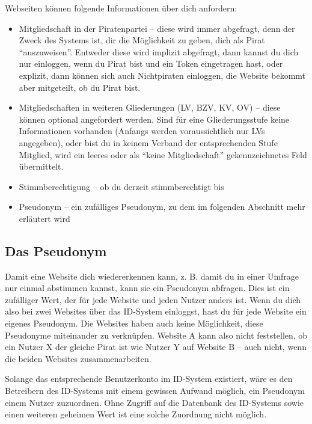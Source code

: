 Webseiten können folgende Informationen über dich anfordern:
\begin{itemize}
	\item Mitgliedschaft in der Piratenpartei -- diese wird immer abgefragt, denn der Zweck des Systems ist, dir die Möglichkeit zu geben, dich als Pirat "`auszuweisen"'.
		Entweder diese wird implizit abgefragt, dann kannst du dich nur einloggen, wenn du Pirat bist und ein Token eingetragen hast,
		oder explizit, dann können sich auch Nichtpiraten einloggen, die Website bekommt aber mitgeteilt, ob du Pirat bist.
	
	\item Mitgliedschaften in weiteren Gliederungen (LV, BZV, KV, OV) -- diese können optional angefordert werden.
		Sind für eine Gliederungsstufe keine Informationen vorhanden (Anfangs werden voraussichtlich nur LVs angegeben),
		oder bist du in keinem Verband der entsprechenden Stufe Mitglied,
		wird ein leeres oder als "`keine Mitgliedschaft"' gekennzeichnetes Feld übermittelt.
		
	\item Stimmberechtigung -- ob du derzeit stimmberechtigt bis
	
	\item Pseudonym -- ein zufälliges Pseudonym, zu dem im folgenden Abschnitt mehr erläutert wird
\end{itemize}

\subsection{Das Pseudonym}
Damit eine Website dich wiedererkennen kann, z. B. damit du in einer Umfrage nur einmal abstimmen kannst, kann sie ein Pseudonym abfragen.
Dies ist ein zufälliger Wert, der für jede Website und jeden Nutzer anders ist.
Wenn du dich also bei zwei Websites über das ID-System einloggst, hast du für jede Website ein eigenes Pseudonym.
Die Websites haben auch keine Möglichkeit, diese Pseudonyme miteinander zu verknüpfen.
Website A kann also nicht feststellen, ob ein Nutzer X der gleiche Pirat ist wie Nutzer Y auf Website B -- auch nicht, wenn die beiden Websites zusammenarbeiten.

Solange das entsprechende Benutzerkonto im ID-System existiert, wäre es den Betreibern des ID-Systems mit einem gewissen Aufwand möglich, ein Pseudonym einem Nutzer zuzuordnen.
Ohne Zugriff auf die Datenbank des ID-Systems sowie einen weiteren geheimen Wert ist eine solche Zuordnung nicht möglich.

